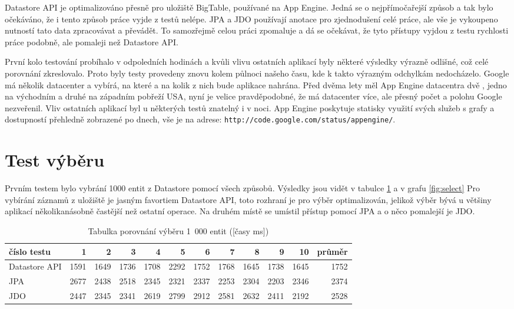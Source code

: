 Datastore API je optimalizováno přesně pro uložiště BigTable, používané na App Engine. Jedná se o nejpřímočařejší způsob a tak bylo očekáváno, že i tento způsob práce vyjde z testů nelépe. JPA a JDO používají anotace pro zjednodušení celé práce, ale vše je vykoupeno nutností tato data zpracovávat a převádět. To samozřejmě celou práci zpomaluje a dá se očekávat, že tyto přístupy vyjdou z testu rychlosti práce podobně, ale pomaleji než Datastore API.

První kolo testování probíhalo v odpoledních hodinách a kvůli vlivu ostatních aplikací byly některé výsledky výrazně odlišné, což celé porovnání zkreslovalo. Proto byly testy provedeny znovu kolem půlnoci našeho času, kde k takto výrazným odchylkám nedocházelo. Google má několik datacenter a vybírá, na které a na kolik z nich bude aplikace nahrána. Před dvěma lety měl App Engine datacentra dvě , jedno na východním a druhé na západním pobřeží USA, nyní je velice pravděpodobné, že má datacenter více, ale přesný počet a polohu Google nezveřenil. Vliv ostatních aplikací byl u některých testů znatelný i v noci. App Engine poskytuje statisky využití svých služeb s grafy a dostupností přehledně zobrazené po dnech, vše je na  adrese: \verb|http://code.google.com/status/appengine/|.

\section{Test výběru}
Prvním testem bylo vybrání 1000 entit z Datastore pomocí všech způsobů. Výsledky jsou vidět v tabulce \ref{tab:select} a v grafu \ref{fig:select} Pro vybírání záznamů z uložiště je jasným favortiem Datastore API, toto rozhraní je pro výběr optimalizován, jelikož výběr bývá u většiny aplikací několikanásobně častější než ostatní operace. Na druhém místě se umístil přístup pomocí JPA a o něco pomalejší je JDO.

\begin{table}[h]
\centering
\caption{Tabulka porovnání výběru 1~000 entit ([časy ms])}\label{tab:select}
\begin{tabular}{|l|r|r|r|r|r|r|r|r|r|r|r|}
   \hline
číslo testu	& 1		& 2		& 3		& 4		& 5		& 6		& 7		& 8		& 9		& 10		& průměr \\
   \hline
Datastore API	& 1591	& 1649	& 1736	& 1708	& 2292	& 1752	& 1768	& 1645	& 1738	& 1645	& 1752 \\
JPA	& 2677	& 2438	& 2518	& 2345	& 2321	& 2337	& 2253	& 2304	& 2203	& 2346	& 2374 \\
JDO	& 2447	& 2345	& 2341	& 2619	& 2799	& 2912	& 2581	& 2632	& 2411	& 2192	& 2528 \\
   \hline
\end{tabular}
\end{table}

